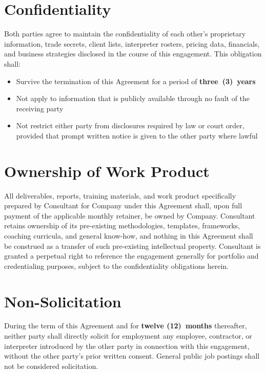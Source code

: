 \documentclass{toospoint}
\begin{document}
\section{Confidentiality}

Both parties agree to maintain the confidentiality of each other's proprietary
information, trade secrets, client lists, interpreter rosters, pricing data,
financials, and business strategies disclosed in the course of this engagement.
This obligation shall:

\begin{itemize}[leftmargin=1.5em, itemsep=4pt, topsep=4pt]
  \item Survive the termination of this Agreement for a period of \textbf{three~(3)~years}
  \item Not apply to information that is publicly available through no fault of the receiving party
  \item Not restrict either party from disclosures required by law or court order, provided that prompt written notice is given to the other party where lawful
\end{itemize}

\section{Ownership of Work Product}

All deliverables, reports, training materials, and work product specifically
prepared by Consultant for Company under this Agreement shall, upon full
payment of the applicable monthly retainer, be owned by Company. Consultant
retains ownership of its pre-existing methodologies, templates, frameworks,
coaching curricula, and general know-how, and nothing in this Agreement shall
be construed as a transfer of such pre-existing intellectual property.
Consultant is granted a perpetual right to reference the engagement
generally for portfolio and credentialing purposes, subject to the
confidentiality obligations herein.

\section{Non-Solicitation}

During the term of this Agreement and for \textbf{twelve (12)~months}
thereafter, neither party shall directly solicit for employment any employee,
contractor, or interpreter introduced by the other party in connection with
this engagement, without the other party's prior written consent. General
public job postings shall not be considered solicitation.
\end{document}
